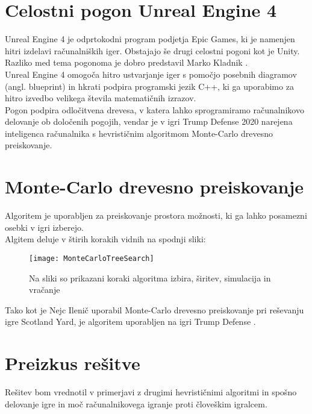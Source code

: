 \documentclass[11pt,a4paper]{article}
\begin{document}
\section{Celostni pogon Unreal Engine 4}
Unreal Engine 4 je odprtokodni program podjetja Epic Games, ki je namenjen hitri izdelavi računalniških iger. Obstajajo še drugi celostni pogoni kot je Unity.\\
Razliko med tema pogonoma je dobro predstavil Marko Kladnik \cite{diploma2}.\\
Unreal Engine 4 omogoča hitro ustvarjanje iger s pomočjo posebnih diagramov (angl. blueprint) in hkrati podpira programski jezik C++, ki ga uporabimo za hitro izvedbo velikega števila matematičnih izrazov.\\
Pogon podpira odločitvena drevesa, v katera lahko sprogramiramo računalnikovo delovanje ob določenih pogojih, vendar je v igri Trump Defense 2020 narejena inteligenca računalnika s hevrističnim algoritmom Monte-Carlo drevesno preiskovanje.

\section{Monte-Carlo drevesno preiskovanje}
Algoritem je uporabljen za preiskovanje prostora možnosti, ki ga lahko posamezni osebki v igri izberejo.\\
Algitem deluje v štirih korakih vidnih na spodnji sliki:
\begin{figure}[htb]
	\begin{center}
		\texttt{[image: MonteCarloTreeSearch]}
	\end{center}
	\caption{Na sliki so prikazani koraki algoritma izbira, širitev, simulacija in vračanje}
	\label{fig:test}
\end{figure}

Tako kot je Nejc Ilenič uporabil Monte-Carlo drevesno preiskovanje pri reševanju igre Scotland Yard, je algoritem uporabljen na igri Trump Defense \cite{diploma3}.

\cite{genetski}

\section{Preizkus rešitve}

Rešitev bom vrednotil v primerjavi z drugimi hevrističnimi algoritmi in spošno delovanje igre in moč računalnikovega igranje proti človeškim igralcem.
\end{document}

